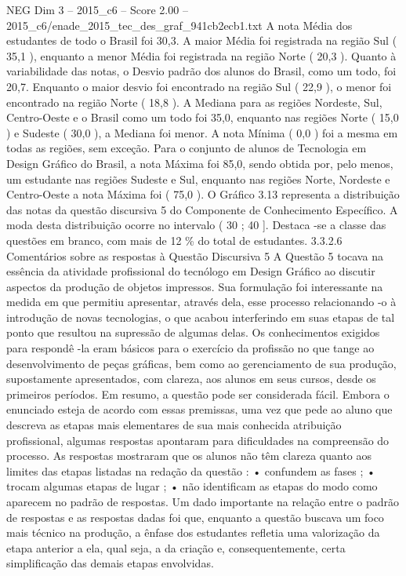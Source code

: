 \begin{textsample}{NEG Dim 3 – 2015\_c6 – Score 2.00 – 2015\_c6/enade\_2015\_tec\_des\_graf\_941cb2ecb1.txt}
A nota Média dos estudantes de todo o Brasil foi 30,3.
A maior Média foi registrada na região Sul ( 35,1 ), enquanto a menor Média foi registrada na região Norte ( 20,3 ).
Quanto à variabilidade das notas, o Desvio padrão dos alunos do Brasil, como um todo, foi 20,7.
Enquanto o maior desvio foi encontrado na região Sul ( 22,9 ), o menor foi encontrado na região Norte ( 18,8 ).
A Mediana para as regiões Nordeste, Sul, Centro-Oeste e o Brasil como um todo foi 35,0, enquanto nas regiões Norte ( 15,0 ) e Sudeste ( 30,0 ), a Mediana foi menor.
A nota Mínima ( 0,0 ) foi a mesma em todas as regiões, sem exceção.
Para o conjunto de alunos de Tecnologia em Design Gráfico do Brasil, a nota Máxima foi 85,0, sendo obtida por, pelo menos, um estudante nas regiões Sudeste e Sul, enquanto nas regiões Norte, Nordeste e Centro-Oeste a nota Máxima foi ( 75,0 ).
O Gráfico 3.13 representa a distribuição das notas da questão discursiva 5 do Componente de Conhecimento Específico.
A moda desta distribuição ocorre no intervalo ( 30 ; 40 ].
Destaca -se a classe das questões em branco, com mais de 12 \% do total de estudantes. 3.3.2.6 Comentários sobre as respostas à Questão Discursiva 5 A Questão 5 tocava na essência da atividade profissional do tecnólogo em Design Gráfico ao discutir aspectos da produção de objetos impressos.
Sua formulação foi interessante na medida em que permitiu apresentar, através dela, esse processo relacionando -o à introdução de novas tecnologias, o que acabou interferindo em suas etapas de tal ponto que resultou na supressão de algumas delas.
Os conhecimentos exigidos para respondê -la eram básicos para o exercício da profissão no que tange ao desenvolvimento de peças gráficas, bem como ao gerenciamento de sua produção, supostamente apresentados, com clareza, aos alunos em seus cursos, desde os primeiros períodos.
Em resumo, a questão pode ser considerada fácil.
Embora o enunciado esteja de acordo com essas premissas, uma vez que pede ao aluno que descreva as etapas mais elementares de sua mais conhecida atribuição profissional, algumas respostas apontaram para dificuldades na compreensão do processo.
As respostas mostraram que os alunos não têm clareza quanto aos limites das etapas listadas na redação da questão : • confundem as fases ; • trocam algumas etapas de lugar ; • não identificam as etapas do modo como aparecem no padrão de respostas.
Um dado importante na relação entre o padrão de respostas e as respostas dadas foi que, enquanto a questão buscava um foco mais técnico na produção, a ênfase dos estudantes refletia uma valorização da etapa anterior a ela, qual seja, a da criação e, consequentemente, certa simplificação das demais etapas envolvidas.

\end{textsample}
